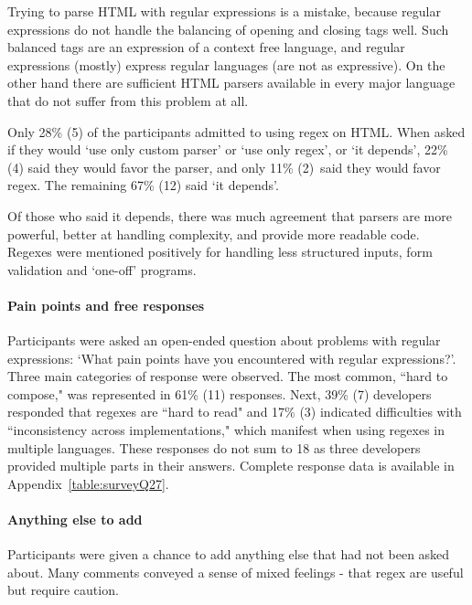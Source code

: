 Trying to parse HTML with regular expressions is a mistake, because regular expressions do not handle the balancing of  opening and closing tags well.  Such balanced tags are an expression of a context free language, and regular expressions (mostly) express regular languages (are not as expressive).  On the other hand there are sufficient HTML parsers available in every major language that do not suffer from this problem at all.

Only 28\% (5) of the participants admitted to using regex on HTML.  When asked if they would `use only custom parser' or `use only regex', or `it depends', 22\% (4) said they would favor the parser, and only 11\% (2) said they would favor regex.  The remaining 67\% (12) said `it depends'.

Of those who said it depends, there was much agreement that parsers are more powerful, better at handling complexity, and provide more readable code.  Regexes were mentioned positively for handling less structured inputs, form validation and `one-off' programs.



\paragraph{Pain points and free responses}\label{sec:painPoints}  Participants were asked an open-ended question about problems with regular expressions: `What pain points have you encountered with regular expressions?'.  Three main categories of response were observed. The most common, ``hard to compose," was represented in 61\% (11) responses. Next, 39\% (7) developers responded that regexes are ``hard to read" and 17\% (3) indicated difficulties with ``inconsistency across implementations," which manifest when using regexes in multiple languages. These responses do not sum to 18 as three developers provided multiple parts in their answers.  Complete response data is available in Appendix~\ref{table:surveyQ27}.

\paragraph{Anything else to add}  Participants were given a chance to add anything else that had not been asked about.  Many comments conveyed a sense of mixed feelings - that regex are useful but require caution.
